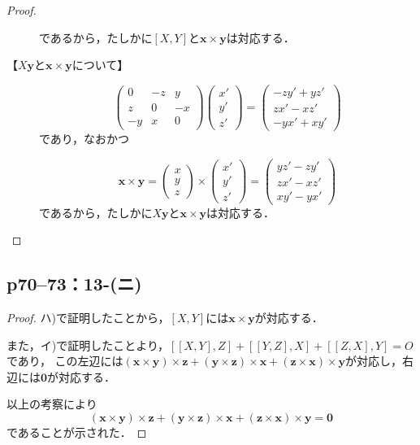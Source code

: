 \documentclass[a4paper,10pt,fleqn]{ltjsarticle}
\begin{document}
\begin{leftbar}
\begin{proof}
\begin{description}
\[            \]
            であるから，たしかに$[X,Y]$と$\bm{x} \times \bm{y}$は対応する．
      \item[【$X\bm{y}$と$\bm{x}\times\bm{y}$について】]
            \[
              \begin{pmatrix} 0 & -z & y \\ z & 0 & -x \\ -y & x & 0 \end{pmatrix} \begin{pmatrix} x' \\ y' \\ z' \end{pmatrix} = \begin{pmatrix} -zy'+yz' \\ zx'-xz' \\ -yx'+xy' \end{pmatrix}
            \]
            であり，なおかつ

            \[
              \bm{x}\times \bm{y} = \begin{pmatrix} x \\ y \\ z \end{pmatrix} \times \begin{pmatrix} x' \\ y ' \\ z' \end{pmatrix} = \begin{pmatrix} yz'-zy' \\ zx'-xz' \\ xy'-yx' \end{pmatrix}
            \]
            であるから，たしかに$X\bm{y}$と$\bm{x} \times \bm{y}$は対応する．
    \end{description}
  \end{proof}
\end{leftbar}


\newpage

\subsection*{p70--73：13-(ニ)}
\begin{tleftbar}
  \begin{proof}
    ハ)で証明したことから，$[X,Y]$には$\bm{x} \times \bm{y}$が対応する．

    また，イ)で証明したことより，$[[X,Y],Z] +[[Y,Z],X]+[[Z,X],Y]=O$であり，
    この左辺には$(\bm{x}\times\bm{y}) \times \bm{z} + (\bm{y}\times\bm{z}) \times \bm{x} + (\bm{z}\times\bm{x}) \times \bm{y}$が対応し，右辺には$\bm{0}$が対応する．

    以上の考察により
    \[
      (\bm{x}\times\bm{y}) \times \bm{z} + (\bm{y}\times\bm{z}) \times \bm{x} + (\bm{z}\times\bm{x}) \times \bm{y} =\bm{0}
    \]
    であることが示された．
  \end{proof}
\end{tleftbar}
\end{document}
